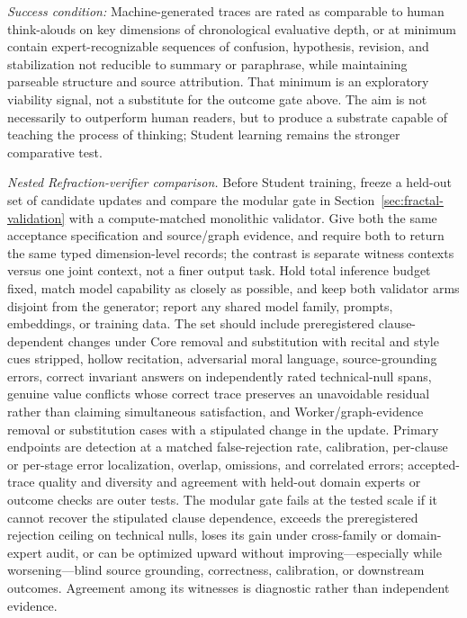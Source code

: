 \emph{Success condition:} Machine-generated traces are rated as comparable
to human think-alouds on key dimensions of chronological evaluative depth, or
at minimum contain expert-recognizable sequences of confusion, hypothesis,
revision, and stabilization not reducible to summary or paraphrase, while
maintaining parseable structure and source attribution. That minimum is an
exploratory viability signal, not a substitute for the outcome gate above.
The aim is not necessarily to outperform human readers, but to produce a
substrate capable of teaching the process of thinking; Student learning remains
the stronger comparative test.

\emph{Nested Refraction-verifier comparison.} Before Student training, freeze a
held-out set of candidate updates and compare the modular gate in
Section~\ref{sec:fractal-validation} with a compute-matched monolithic
validator. Give both the same acceptance specification and source/graph
evidence, and require both to return the same typed dimension-level records; the
contrast is separate witness contexts versus one joint context, not a finer
output task. Hold total inference budget fixed, match model capability as
closely as possible, and keep both validator arms disjoint from the generator;
report any shared model family, prompts, embeddings, or training data. The set
should include preregistered clause-dependent changes under Core removal and
substitution with recital and style cues stripped, hollow recitation,
adversarial moral language, source-grounding errors, correct invariant answers
on independently rated technical-null spans, genuine value conflicts whose
correct trace preserves an unavoidable residual rather than claiming
simultaneous satisfaction, and Worker/graph-evidence removal or substitution
cases with a stipulated change in the update. Primary endpoints are detection
at a matched false-rejection rate, calibration, per-clause or per-stage error
localization, overlap, omissions, and correlated errors;
accepted-trace quality and diversity and agreement with held-out domain experts
or outcome checks are outer tests.
The modular gate fails at the tested scale if it cannot recover the stipulated
clause dependence, exceeds the preregistered rejection ceiling on technical
nulls, loses its gain under cross-family or domain-expert audit, or can be
optimized upward without improving---especially while worsening---blind source
grounding, correctness, calibration, or downstream outcomes. Agreement among
its witnesses is diagnostic rather than independent evidence.

